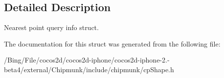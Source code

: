 \subsection{Detailed Description}
Nearest point query info struct. 

The documentation for this struct was generated from the following file\-:\begin{DoxyCompactItemize}
\item 
/\-Bing/\-File/cocos2d/cocos2d-\/iphone/cocos2d-\/iphone-\/2.-\/beta4/external/\-Chipmunk/include/chipmunk/cp\-Shape.\-h\end{DoxyCompactItemize}
